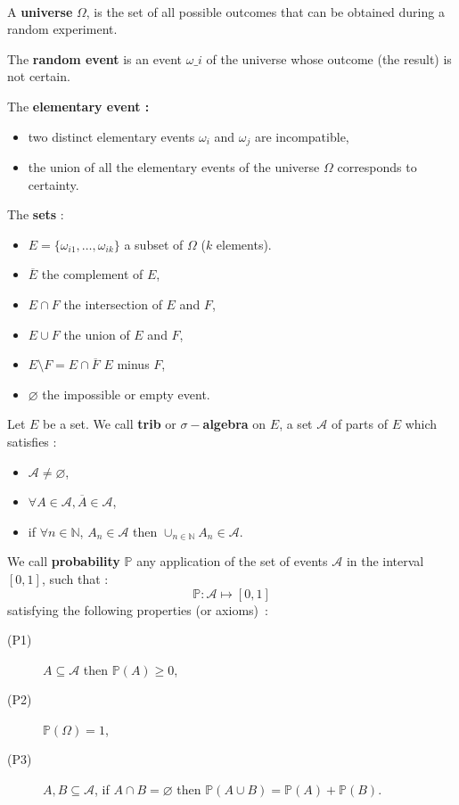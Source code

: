
\begin{f}[Axiomatic]{\ }
	
	A \textbf{universe} \(\Omega\), is the set of all possible outcomes that can be obtained during a random experiment.
	
	The \textbf{random event} is an event \(\omega\_i\) of the universe whose outcome (the result) is not certain.
	
	
	The \textbf{elementary event :}
	\begin{itemize}
		\item two distinct elementary events \(\omega_i\) and \(\omega_j\) are incompatible,
		\item the union of all the elementary events of the universe \(\Omega \) corresponds to certainty.
	\end{itemize}
	
	The \textbf{sets} :
	\begin{itemize}
		\item \(E=\lbrace \omega_{i1},\ldots , \omega_{ik}\rbrace\) a subset of \(\Omega\) (\(k\) elements).
		\item \(\overline{E}\) the complement of \(E\),
		\item \(E\cap F\) the intersection of \(E\) and \(F\),
		\item \(E\cup F\) the union of \(E\) and \(F\),
		\item \(E\setminus F= E\cap\overline{F}\) \(E\) minus \(F\),
		\item \(\varnothing\) the impossible or empty event.
	\end{itemize}
	
	Let \(E\) be a set. We call \textbf{trib} or \textbf{\(\sigma-\)algebra} on \(E\), a set \(\mathcal{A}\) of parts of \(E\) which satisfies :
	\begin{itemize}
		\item     \(\mathcal{A} \not=\varnothing\),
		\item     \(\forall A \in \mathcal{A} , \overline{A} \in\mathcal{A}\),
		\item     if \(\forall n \in \mathbb{N}\), \(A_n \in\mathcal{A}\) then \(\cup_{n\in\mathbb{N} } A_n \in\mathcal{A}\).
	\end{itemize}
	
	We call \textbf{probability} \(\mathbb{P}\) any application of the set of events \(\mathcal{A}\) in the interval \([0,1]\), such that :      \[\mathbb{P} :      \mathcal{A}  \mapsto   [0,1]\]
	satisfying the following properties (or axioms)~:
	\begin{description}
		\item[(P1)] \(A \subseteq \mathcal{A} \)    then  \( \mathbb{P}(A) \geq 0\),
		\item[(P2)] \( \mathbb{P}(\Omega) = 1\),
		\item[(P3)] \(A, B \subseteq \mathcal{A}\),  if  \(A\cap B =\varnothing\)    then   \(\mathbb{P}(A\cup B)=\mathbb{P}(A) + \mathbb{P}(B)\).
	\end{description}
	

\end{f}
